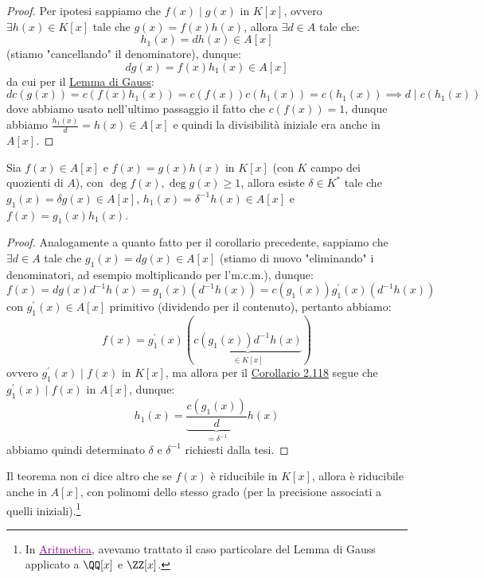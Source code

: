 \documentclass[11pt]{scrartcl}
\begin{document}
\begin{proof}
    Per ipotesi sappiamo che $f(x) \mid g(x)$ in $K[x]$, ovvero $\exists h(x) \in K[x]$ tale che $g(x) = f(x)h(x)$, allora $\exists d \in A$ tale che:
    \[ h_1(x) = dh(x) \in A[x]
        \]
    (stiamo "cancellando" il denominatore), dunque:
    \[ dg(x) = f(x)h_1(x) \in A[x]
        \]
    da cui per il \hyperref[gauss]{Lemma di Gauss}:
    \[ dc(g(x)) = c(f(x)h_1(x)) = c(f(x))c(h_1(x)) = c(h_1(x)) \implies d \mid c(h_1(x))
        \]
    dove abbiamo usato nell'ultimo passaggio il fatto che $c(f(x)) = 1$, dunque abbiamo $\displaystyle\frac{h_1(x)}{d} = h(x) \in A[x]$
    e quindi la divisibilità iniziale era anche in $A[x]$. 
\end{proof}

\begin{corollary}
    \label{2.119}
    Sia $f(x) \in A[x]$ e $f(x) = g(x)h(x)$ in $K[x]$ (con $K$ campo dei quozienti di $A$), con $\deg f(x),\deg g(x) \geq 1$,
    allora esiste $\delta \in K^*$ tale che $g_1(x) = \delta g(x) \in A[x]$, $h_1(x) = \delta^{-1}h(x) \in A[x]$ e $f(x) = g_1(x)h_1(x)$.
\end{corollary}

\begin{proof}
    Analogamente a quanto fatto per il corollario precedente, sappiamo che $\exists d \in A$ tale che $g_1(x) = dg(x) \in A[x]$ (stiamo di nuovo "eliminando" i denominatori, ad esempio moltiplicando per l'm.c.m.),
    dunque:
    \[ f(x) = dg(x)d^{-1}h(x) = g_1(x)(d^{-1}h(x)) = c(g_1(x))g_1^{\prime}(x)(d^{-1}h(x))
        \]
    con $g_1^{\prime}(x) \in A[x]$ primitivo (dividendo per il contenuto), pertanto abbiamo:
    \[ f(x) = g_1^{\prime}(x)(\underbrace{c(g_1(x))d^{-1}h(x)}_{\in K[x]})
        \]
    ovvero $g_1^{\prime}(x) \mid f(x)$ in $K[x]$, ma allora per il \hyperref[2.118]{Corollario 2.118} segue che $g_1^{\prime}(x) \mid f(x)$ in $A[x]$, dunque:
    \[ h_1(x) = \underbrace{\frac{c(g_1(x))}{d}}_{= \delta^{-1}}h(x)
        \]
    abbiamo quindi determinato $\delta$ e $\delta^{-1}$ richiesti dalla tesi.
\end{proof}

\begin{remark}
    Il teorema non ci dice altro che se $f(x)$ è riducibile in $K[x]$, allora è riducibile anche in $A[x]$, con polinomi dello stesso grado (per la precisione associati a quelli iniziali).\footnote{In
    \href{https://github.com/diego-unipi/Appunti-Aritmetica}{\textcolor{purple}{Aritmetica}}, avevamo trattato il caso particolare del Lemma di Gauss applicato a $\QQ[x]$ e $\ZZ[x]$.}
\end{remark}
\end{document}

